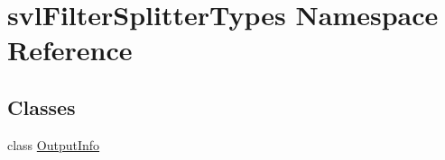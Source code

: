 \hypertarget{namespacesvl_filter_splitter_types}{\section{svl\-Filter\-Splitter\-Types Namespace Reference}
\label{namespacesvl_filter_splitter_types}
}
\subsection*{Classes}
\begin{DoxyCompactItemize}
\item 
class \hyperlink{classsvl_filter_splitter_types_1_1_output_info}{Output\-Info}
\end{DoxyCompactItemize}
